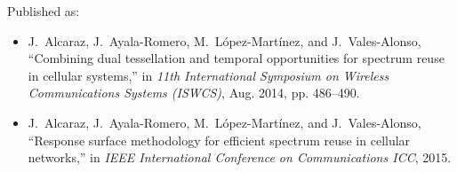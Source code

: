 \begin{itemize}
Published as: 
\begin{itemize}
\item J.~Alcaraz, J.~Ayala-Romero, M.~L\'{o}pez-Mart\'{i}nez, and J.~Vales-Alonso,
  ``Combining dual tessellation and temporal opportunities for spectrum reuse
  in cellular systems,'' in \emph{11th International Symposium on Wireless
  Communications Systems ({ISWCS})}, Aug. 2014, pp. 486--490.

\item J.~Alcaraz, J.~Ayala-Romero, M.~L\'{o}pez-Mart\'{i}nez, and J.~Vales-Alonso, ``Response surface methodology for efficient spectrum reuse in cellular
  networks,'' in \emph{{IEEE} International Conference on Communications
  {ICC}}, 2015.
\end{itemize}  
\end{itemize}

